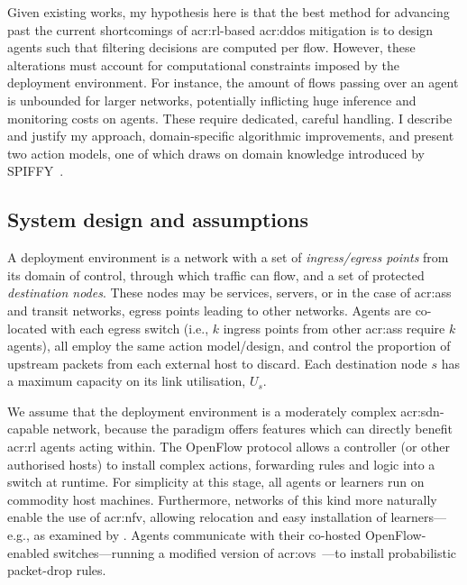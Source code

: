 Given existing works, my hypothesis here is that the best method for advancing past the current shortcomings of \gls{acr:rl}-based \gls{acr:ddos} mitigation is to design agents such that filtering decisions are computed per flow.
However, these alterations must account for computational constraints imposed by the deployment environment.
For instance, the amount of flows passing over an agent is unbounded for larger networks, potentially inflicting huge inference and monitoring costs on agents.
These require dedicated, careful handling.
I describe and justify my approach, domain-specific algorithmic improvements, and present two action models, one of which draws on domain knowledge introduced by SPIFFY~\parencite{DBLP:conf/ndss/KangGS16}.

\subsection{System design and assumptions}
A deployment environment is a network with a set of \emph{ingress/egress points} from its domain of control, through which traffic can flow, and a set of protected \emph{destination nodes}.
These nodes may be services, servers, or in the case of \glspl{acr:as} and transit networks, egress points leading to other networks.
Agents are co-located with each egress switch (i.e., $k$ ingress points from other \glspl{acr:as} require $k$ agents), all employ the same action model/design, and control the proportion of upstream packets from each external host to discard.
Each destination node $s$ has a maximum capacity on its link utilisation, $U_s$.

We assume that the deployment environment is a moderately complex \gls{acr:sdn}-capable network, because the paradigm offers features which can directly benefit \gls{acr:rl} agents acting within.
The OpenFlow protocol allows a controller (or other authorised hosts) to install complex actions, forwarding rules and logic into a switch at runtime.
For simplicity at this stage, all agents or learners run on commodity host machines.
Furthermore, networks of this kind more naturally enable the use of \gls{acr:nfv}, allowing relocation and easy installation of learners---e.g., as examined by \textcite{DBLP:journals/tnsm/JakariaRF19}.
Agents communicate with their co-hosted OpenFlow-enabled switches---running a modified version of \gls{acr:ovs}~\parencite{open-vswitch,DBLP:conf/nsdi/PfaffPKJZRGWSSA15}---to install probabilistic packet-drop rules.

